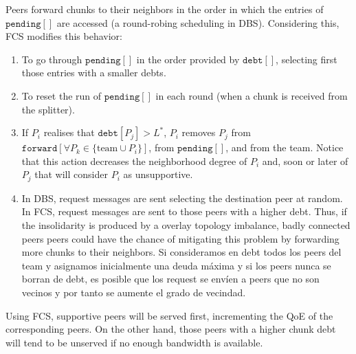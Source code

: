 Peers forward chunks to their neighbors in the order in which the
entries of $\mathtt{pending}[]$ are accessed (a round-robing
scheduling in DBS). Considering this, FCS modifies this behavior:
\begin{enumerate}
\item To go through $\mathtt{pending}[]$ in the order provided by
  $\mathtt{debt}[]$, selecting first those entries with a smaller
  debts.
\item To reset the run of $\mathtt{pending}[]$ in each round (when a
  chunk is received from the splitter).
\item If $P_i$ realises that $\mathtt{debt}[P_j]>L^*$, $P_i$ removes
  $P_j$ from $\mathtt{forward}[\forall P_k\in\{\text{team}\cup
  P_i\}]$, from $\mathtt{pending}[]$, and from the team. Notice that
  this action decreases the neighborhood degree of $P_i$ and, soon or
  later of $P_j$ that will consider $P_i$ as unsupportive.
\item In DBS, request messages are sent selecting the destination peer
  at random. In FCS, request messages are sent to those peers with a
  higher debt. Thus, if the insolidarity is produced by a overlay
  topology imbalance, badly connected peers peers could have the
  chance of mitigating this problem by forwarding more chunks to their
  neighbors. Si consideramos en debt todos los peers del team y asignamos inicialmente una deuda máxima y si los peers nunca se borran de debt, es posible que los request se envíen a peers que no son vecinos y por tanto se aumente el grado de vecindad.
\end{enumerate}

Using FCS, supportive peers will be served first, incrementing the
QoE of the corresponding peers. On the other hand, those peers with a
higher chunk debt will tend to be unserved if no enough bandwidth is
available. 


